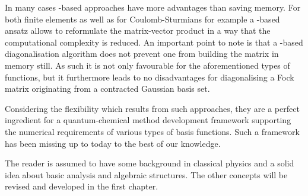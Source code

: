 In many cases \contraction-based approaches
have more advantages than saving memory.
For both finite elements as well as for Coulomb-Sturmians
for example a \contraction-based ansatz
allows to reformulate the matrix-vector product in a way
that the computational complexity is reduced.
An important point to note is that
a \contraction-based diagonalisation algorithm
does not prevent one from building the matrix in memory still.
As such it is not only favourable for the aforementioned
types of functions,
but it furthermore leads to no disadvantages
for diagonalising a Fock matrix originating from
a contracted Gaussian basis set.

Considering the flexibility which results from such approaches,
they are a perfect ingredient for
a quantum-chemical method development framework
supporting the numerical requirements of various types of basis functions.
Such a framework has been missing up to today to the best of our knowledge.

The reader is assumed to have some background in classical physics
and a solid idea about basic analysis and algebraic structures.
The other concepts will be revised and developed in the first chapter.

